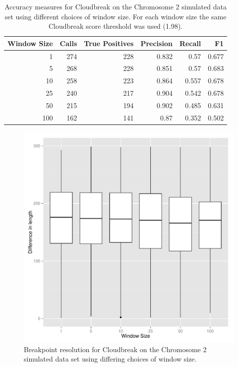 \begin{table}
\begin{center}
\begin{tabular}{r|rrrrr}
 \hline
 Window Size & Calls & True Positives & Precision & Recall & F1 \\ 
 \hline
   1 & 274 & 228 & 0.832 & 0.57 & 0.677 \\ 
   5 & 268 & 228 & 0.851 & 0.57 & 0.683 \\ 
   10 & 258 & 223 & 0.864 & 0.557 & 0.678 \\ 
   25 & 240 & 217 & 0.904 & 0.542 & 0.678 \\ 
   50 & 215 & 194 & 0.902 & 0.485 & 0.631 \\ 
   100 & 162 & 141 & 0.87 & 0.352 & 0.502 \\  
\end{tabular}
\end{center}
\caption[Cloudbreak accuracy with varying window sizes.]{Accuracy measures for Cloudbreak on the Chromosome 2 simulated data set using different choices of window size. For each window size the same Cloudbreak score threshold was used (1.98).}
\label{chr2AccuracyByWindowSize}
\end{table}
\begin{figure}
\centering
\includegraphics[width=.8\textwidth]{figures/breakpoint_resolution_by_windowSize.pdf}
\caption[Cloudbreak breakpoint resolution with varying window sizes.]{Breakpoint resolution for Cloudbreak on the Chromosome 2 simulated data set using differing choices of window size.}
\label{breakpoint_resolution_by_windowSize}
\end{figure}

